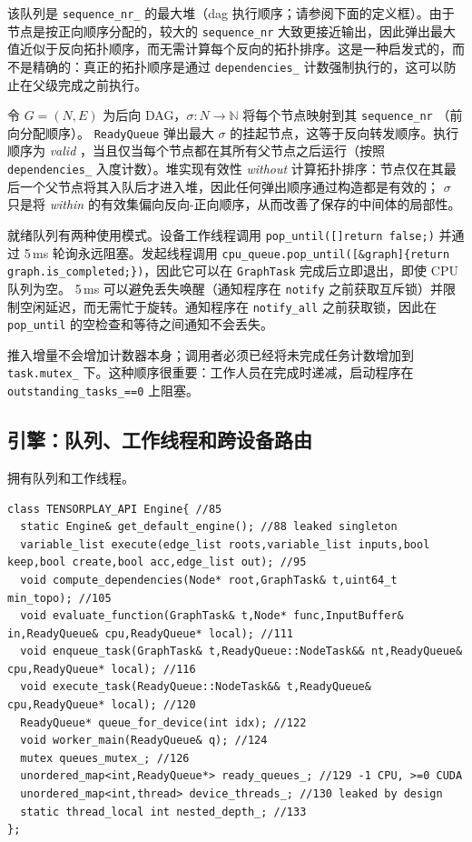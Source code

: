 该队列是 \texttt{sequence\_nr\_} 的最大堆（\ac{dag} 执行顺序；请参阅下面的定义框）。由于节点是按正向顺序分配的，较大的 \texttt{sequence\_nr} 大致更接近输出，因此弹出最大值近似于反向拓扑顺序，而无需计算每个反向的拓扑排序。这是一种启发式的，而不是精确的：真正的拓扑顺序是通过 \texttt{dependencies\_} 计数强制执行的，这可以防止在父级完成之前执行。

\begin{tpdef}
令 $G=(N,E)$ 为后向 DAG，$\sigma:N\rightarrow\mathbb{N}$ 将每个节点映射到其 \texttt{sequence\_nr} （前向分配顺序）。 \texttt{ReadyQueue} 弹出最大 $\sigma$ 的挂起节点，这等于反向转发顺序。执行顺序为 \emph{valid} ，当且仅当每个节点都在其所有父节点之后运行（按照 \texttt{dependencies\_} 入度计数）。堆实现有效性 \emph{without} 计算拓扑排序：节点仅在其最后一个父节点将其入队后才进入堆，因此任何弹出顺序通过构造都是有效的； $\sigma$ 只是将 \emph{within} 的有效集偏向反向-正向顺序，从而改善了保存的中间体的局部性。
\end{tpdef}

就绪队列有两种使用模式。设备工作线程调用 \texttt{pop\_until([]{return false;})} 并通过 5\,ms 轮询永远阻塞。发起线程调用 \texttt{cpu\_queue.pop\_until([\&graph]\{return graph.is\_completed;\})}，因此它可以在 \texttt{GraphTask} 完成后立即退出，即使 CPU 队列为空。 5\,ms 可以避免丢失唤醒（通知程序在 \texttt{notify} 之前获取互斥锁）并限制空闲延迟，而无需忙于旋转。通知程序在 \texttt{notify\_all} 之前获取锁，因此在 \texttt{pop\_until} 的空检查和等待之间通知不会丢失。

推入增量不会增加计数器本身；调用者必须已经将未完成任务计数增加到 \texttt{task.mutex\_} 下。这种顺序很重要：工作人员在完成时递减，启动程序在 \texttt{outstanding\_tasks\_==0} 上阻塞。

\subsection{引擎：队列、工作线程和跨设备路由}
\label{subsec:enginequeues}

拥有队列和工作线程。

\begin{lstlisting}[caption={engine.}, label=lst:engineh]
class TENSORPLAY_API Engine{ //85
  static Engine& get_default_engine(); //88 leaked singleton
  variable_list execute(edge_list roots,variable_list inputs,bool keep,bool create,bool acc,edge_list out); //95
  void compute_dependencies(Node* root,GraphTask& t,uint64_t min_topo); //105
  void evaluate_function(GraphTask& t,Node* func,InputBuffer& in,ReadyQueue& cpu,ReadyQueue* local); //111
  void enqueue_task(GraphTask& t,ReadyQueue::NodeTask&& nt,ReadyQueue& cpu,ReadyQueue* local); //116
  void execute_task(ReadyQueue::NodeTask&& t,ReadyQueue& cpu,ReadyQueue* local); //120
  ReadyQueue* queue_for_device(int idx); //122
  void worker_main(ReadyQueue& q); //124
  mutex queues_mutex_; //126
  unordered_map<int,ReadyQueue*> ready_queues_; //129 -1 CPU, >=0 CUDA
  unordered_map<int,thread> device_threads_; //130 leaked by design
  static thread_local int nested_depth_; //133
};
\end{lstlisting}


